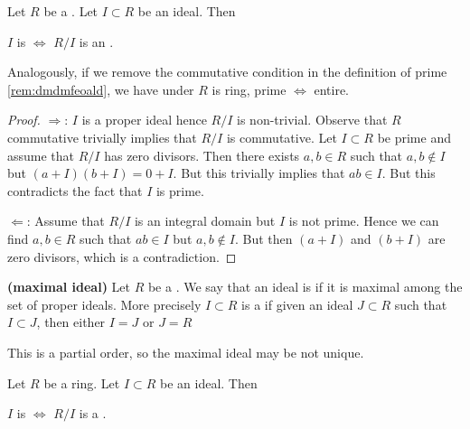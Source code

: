 \documentclass{article}
\newcommand{\bfs}[1]{\textbf{({#1}) }}
\begin{document}
\begin{lema}
 Let $R$ be a . Let $I \subset R$ be an ideal. Then 
 
 \centerline{$I$ is  $\Longleftrightarrow$ $R / I$ is an .}
\end{lema}
\begin{rema}
Analogously, if we remove the commutative condition in the definition of prime \cref{rem:dmdmfeoald}, we have under $R$ is ring,  prime $\Longleftrightarrow$ entire.
\end{rema}
\begin{proof}
$\Rightarrow$:
  $I$ is a proper ideal hence $R / I$ is non-trivial.
Observe that $R$ commutative trivially implies that $R / I$ is commutative. Let $I \subset R$ be prime and assume that $R / I$ has zero divisors. Then there exists $a, b \in R$ such that $a, b \notin I$ but $(a+I)(b+I)=0+I$. But this trivially implies that $a b \in I$. But this contradicts the fact that $I$ is prime.

$\Leftarrow$:
Assume that $R / I$ is an integral domain but $I$ is not prime. Hence we can find $a, b \in R$ such that $a b \in I$ but $a, b \notin I$. But then $(a+I)$ and $(b+I)$ are zero divisors, which is a contradiction.
\end{proof}
\begin{defa}\bfs{maximal ideal}
Let $R$ be a . We say that an ideal is  if it is maximal among the set of proper ideals. More precisely $I \subset R$ is a  if given an ideal $J \subset R$ such that $I \subset J$, then either $I=J$ or $J=R$
\end{defa}
\begin{rema}
This is a partial order, so the maximal ideal may be not unique.
\end{rema}
\begin{lema}\label{lem:omdnad}
 Let $R$ be a  ring. Let $I \subset R$ be an ideal. Then 
 
 \centerline{$I$ is  $\Longleftrightarrow$ $R / I$ is a .}
\end{lema} 
\end{document}
